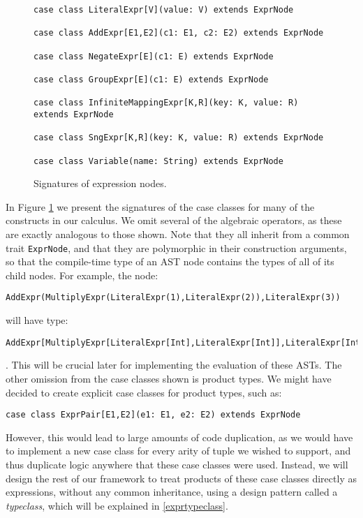 \begin{figure}
\begin{lstlisting}
case class LiteralExpr[V](value: V) extends ExprNode

case class AddExpr[E1,E2](c1: E1, c2: E2) extends ExprNode

case class NegateExpr[E](c1: E) extends ExprNode

case class GroupExpr[E](c1: E) extends ExprNode

case class InfiniteMappingExpr[K,R](key: K, value: R) extends ExprNode

case class SngExpr[K,R](key: K, value: R) extends ExprNode

case class Variable(name: String) extends ExprNode

\end{lstlisting}
\caption{Signatures of expression nodes.}
\label{exprnodes}
\end{figure}

In Figure \ref{exprnodes} we present the signatures of the case classes for many of the constructs in our calculus. We omit several of the algebraic operators, as these are exactly analogous to those shown. Note that they all inherit from a common trait \lstinline{ExprNode}, and that they are polymorphic in their construction arguments, so that the compile-time type of an AST node contains the types of all of its child nodes. For example, the node:
\vs\begin{lstlisting}
AddExpr(MultiplyExpr(LiteralExpr(1),LiteralExpr(2)),LiteralExpr(3))
\end{lstlisting}\vs
will have type:
\vs\begin{lstlisting}
AddExpr[MultiplyExpr[LiteralExpr[Int],LiteralExpr[Int]],LiteralExpr[Int]]
\end{lstlisting}\vs.
This will be crucial later for implementing the evaluation of these ASTs.
The other omission from the case classes shown is product types. We might have decided to create explicit case classes for product types, such as:
\vs\begin{lstlisting}
case class ExprPair[E1,E2](e1: E1, e2: E2) extends ExprNode
\end{lstlisting}\vs
However, this would lead to large amounts of code duplication, as we would have to implement a new case class for every arity of tuple we wished to support, and thus duplicate logic anywhere that these case classes were used. Instead, we will design the rest of our framework to treat products of these case classes directly as expressions, without any common inheritance, using a design pattern called a \textit{typeclass}, which will be explained in \ref{exprtypeclass}.

